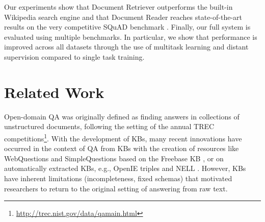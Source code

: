 \documentclass[11pt,a4paper]{article}
\newcommand\us{DrQA\xspace}
\newcommand\usr{Document Retriever\xspace}
\newcommand\usp{Document Reader\xspace}
\begin{document}
Our experiments show that \usr outperforms the built-in Wikipedia search engine and that \usp reaches state-of-the-art results on the very competitive SQuAD benchmark \cite{rajpurkar2016squad}.
%
%
%
%
Finally, our full system is evaluated using multiple benchmarks. In particular, we show that performance is improved across all datasets through the use of multitask learning and distant supervision compared to single task training. %




\section{Related Work} \label{sec:rwork}

Open-domain QA was originally defined as finding answers in collections of unstructured documents, following the setting of the annual TREC competitions\footnote{\url{http://trec.nist.gov/data/qamain.html}}.
%
With the development of KBs, many recent innovations have occurred in the context of QA from KBs with the creation of resources like WebQuestions \cite{berant2013semantic} and SimpleQuestions \cite{bordes2015large} based on the Freebase KB \cite{bollacker2008freebase},
or on automatically extracted KBs, e.g., OpenIE triples and NELL \cite{fader2014open}.
%
However, KBs have inherent limitations (incompleteness, fixed schemas) that
motivated researchers to return to the original setting of answering from raw text.
\end{document}
